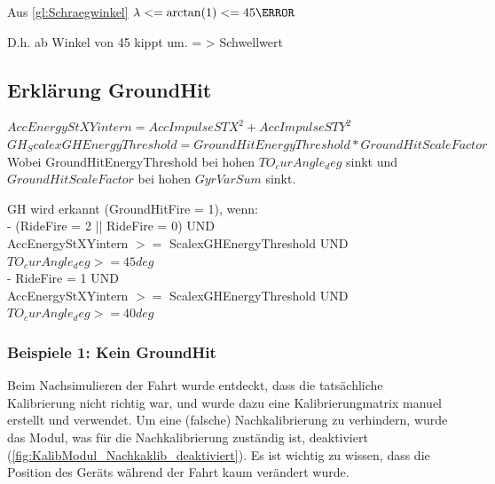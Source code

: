 Aus \autoref{gl:Schraegwinkel} $\lambda <= \arctan(1) <= 45 \degree$

D.h. ab Winkel von 45 kippt um. = > Schwellwert



\subsection{Erklärung GroundHit}
%
%
%
%
$AccEnergyStXYintern = AccImpulseSTX^2+ AccImpulseSTY^2$\\
$GH_ScalexGHEnergyThreshold = GroundHitEnergyThreshold * GroundHitScaleFactor$\\
Wobei GroundHitEnergyThreshold bei hohen $TO_curAngle_deg$ sinkt und $GroundHitScaleFactor$ bei hohen $GyrVarSum$ sinkt.

GH wird erkannt (GroundHitFire = 1), wenn:\\
-	(RideFire = 2 || RideFire = 0) UND \\
AccEnergyStXYintern $>=$ ScalexGHEnergyThreshold UND\\
$TO_curAngle_deg >=45 deg$\\

-	RideFire = 1 UND \\
AccEnergyStXYintern $>=$ ScalexGHEnergyThreshold UND\\
$TO_curAngle_deg >=40 deg$

\subsubsection{Beispiele 1: Kein GroundHit}
Beim Nachsimulieren der Fahrt wurde entdeckt, dass die tatsächliche Kalibrierung nicht richtig war, und wurde dazu eine Kalibrierungmatrix manuel erstellt und verwendet. Um eine (falsche) Nachkalibrierung zu verhindern, wurde das Modul, was für die Nachkalibrierung zuständig ist, deaktiviert (\autoref{fig:KalibModul_Nachkaklib_deaktiviert}). Es ist wichtig zu wissen, dass die Position des Geräts während der Fahrt kaum verändert wurde.

